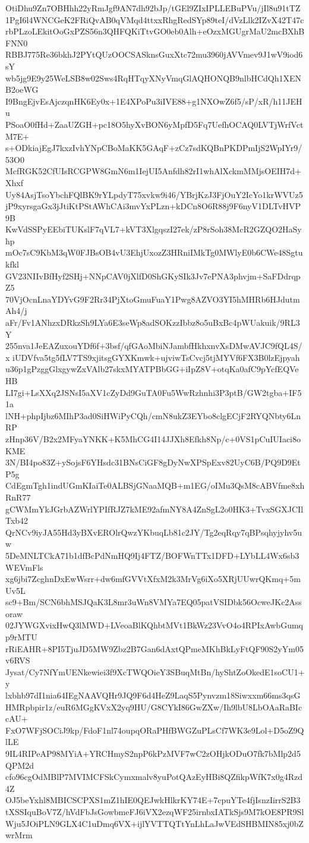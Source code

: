 OtiDhu9Zn7OBHhh22yRmJgf9AN7dh92bJp/tGEl9ZIxIPLLEBuPVu/jIl8u91tTZ
1PgI6l4WNCGeK2FRiQvAB0qVMqd4ttxxRhgRedSYp89teI/dVzLlk2IZvX42T47c
rbPLzoLEkitOoGxPZS56n3QHFQKiTtvGO0eb0Alh+eOzxMGUgrMaU2mcBXhBFNN0
RBBJ775Re36bkhJ2PYtQUzOOCSASknsGuxXtc72mu3960jAVVmev9J1wV9iod6sY
wb5jg9E9y25WeLSB8w02Sws4RqHTqyXNyVmqGlAQHONQB9nlbHCdQh1XENB2oeWG
I9BngEjvEsAjczqnHK6Ey0x+1E4XPoPu3iIVE88+g1NXOwZ6f5/sP/xR/h11JEHu
PSoaO0fHd+ZaaUZGH+pc18O5hyXvBON6yMpfD5Fq7UefhOCAQ0LVTjWrfVctM7E+
s+ODkiajEgJ7kxzIvhYNpCBoMaKK5GAqF+zCz7sdKQBnPKDPmIjS2WpIYr9/53O0
McfRGK52CfUIsRCGPW8GmN6m1IejUI5Anfdh82rI1whAlXckmMMjsOEIH7d+Xhxf
Uy84AsjTsoYbchFQlBK9rYLpdyT75xvkw9i46/YBrjKzJ3FjOuY2IcYo1krWVUz5
jP9xyrsgaGx3jJtiKtPStAWhCAi3mvYxPLzn+kDCn8O6R88j9F6nyV1DLTvHVP9B
KwVdSSPyEEbiTUKslF7qVL7+kVT3XlgqszI27ek/zP8rSoh38McR2GZQO2HaSyhp
mOc7sC9KbM3qW0FJBsOB4vU3EhjUxozZ3HRniIMkTg0MWlyE0b6CWe48Sgtukfkl
GV23NIIvBfHyf2SHj+NNpCAV0jXlfD0ShGKySIk3Jv7ePNA3phvjm+SaFDdrqpZ5
70VjOcnLnaYDYvG9F2Rr34PjXtoGmuFuaY1Pwg8AZVO3YI5hMHRb6HJdutmAh4/j
aFr/Fv1ANhzxDRkzSh9LYa6E3seWp8adSOKzzIbbz8o5uBxBc4pWUakuik/9RL3Y
255nva1JeEAZuxouYDf6f+3bsf/qfGAoMbiNJambfHkhxnvXsDMwAVJC9fQL4S/x
iUDVfva5tg5fLV7TS9xjitsgGYXKmwk+ujviwTsCvcj5tjMYVf6FX3B0lzEjpyah
u36p1gPzggGlxgywZxVAlb27skxMYATPBbGG+iIpZ8V+otqKa0afC9pYcfEQVeHB
LI7gi+LsXXq2JSNsI5aXV1cZyDd9GuTA0Fu5WwRzhnhi3P3ptB/GW2tgba+IF51a
lNH+phpIjbz6MIhP3ad0SiHWiPyCQh/cmN8ukZ3EYbo8clgECjF2RYQNbty6LnRP
zHnp36V/B2x2MFyaYNKK+K5MhCG4I14JJXh8Efkh8Np/c+0VS1pCuIUIaci8oKME
3N/BI4po83Z+ySojsF6YHsdc31BNsCiGF8gDyNwXPSpExv82UyC6B/PQ9D9EtP5g
CdEgmTgh1indUGmKIaiTe0ALBSjGNaaMQB+m1EG/oIMu3QsM8cABVfme8xhRnR77
gCWMmYkJGrbAZWrlYPIfRJZ7kME92afmNY8A4ZnSgL2o0HK3+TvxSGXJCIlTxb42
QrNCv9iyJA55Hd3yBXvEROlrQwzYKbuqLb81c2JY/Tg2eqRqy7qBPsqhyjyhv5uw
5DeMNLTCkA71b1dfBcPdNmHQ9Ij4FTZ/BOFWnTTx1DFD+LYbLL4Wx6sb3WEVmFls
xg6jbi7ZcghnDxEwWsrr+dw6mfGVVtXfxM2k3MrVg6iXo5XRjUUwrQKmq+5mUv5L
sc9+Bm/SCN6bhMSJQaK3L8mr3uWn8VMYa7EQ05patVSIDbk56OcweJKc2Assoraw
02JYWGXvixHwQ3lMWD+LVeoaBlKQhbtMVt1BkWz23VvO4o4RPIxAwbGumqp9rMTU
rRiEAHR+8PI5TjuJD5MW9Zbz2B7Gan6dAxtQPmeMKhBkLyFtQF90S2yYm05v6RVS
Jysat/Cy7NfYmUENkewiei3f9XcTWQOieY3SBuqMtBn/hyShtZoOkedE1soCU1+y
lxbhb97dI1nia64IEgNAAVQHr9JQ9F6d4HeZ9LaqS5Pynvzm18Siwxxm66ms3qsG
HMRpbpir1z/euR6MGgKVxX2yq9HU/G8CYkI86GwZXw/Ih9lbU8LbOAaRaBIccAU+
FxO7WFjSOCiJ9kp/FdoF1nl74oupqORaPHfBWGZuPLsCf7WK3e9Lol+D5oZ9QlLE
9IL4RIPeAP98MYiA+YRCHmyS2npP6kPzMVF7wC2zOHjkODuO7fk7bMlp2d5QPM2d
cfo96cgOdMBlP7MVIMCFSkCymxmalv8yuPotQAzEyHBi8QZfikpWfK7x0g4Rzd4Z
OJ5beYxhl8MBICSCPXS1mZ1hIE0QEJwkHlkrKY74E+7cpuYTe4fjIsnzIirrS2B3
tXSSIquBoV7Z/hVdFbJsGowbmeFJ6iVX2ezqWF25irnbxIATkSjs9M7kOE8PR9Sl
Wju5JOiPLN9GLX4C1uDmq6VX+ijlYVTTQTtYnLhLaJwVEdSHBMIN85xj0bZwrMrm

